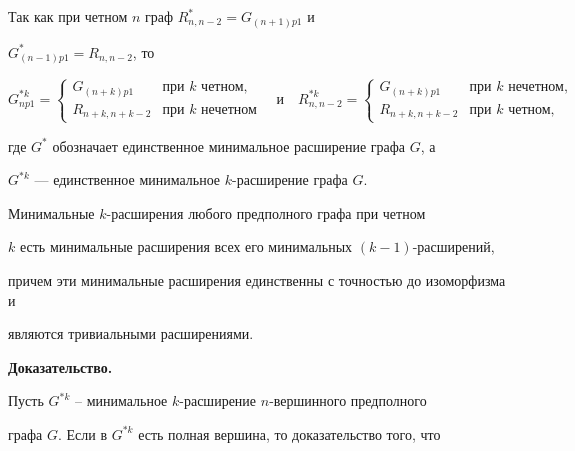 \begin{cornonum}


Так как при четном $n$ граф $R^*_{n,n-2} = G_{(n+1)p1}$ и


$G^{*}_{(n-1)p1} = R_{n,n-2}$, то


$$


G^{*k}_{np1} =


\begin{cases}


G_{(n+k)p1} & \text{при $k$ четном},\\


R_{n+k,n+k-2} & \text{при $k$ нечетном}


\end{cases}


\quad \text{и}\quad


R_{n,n-2}^{*k} =


\begin{cases}


G_{(n+k)p1} & \text{при $k$ нечетном}, \\


R_{n+k,n+k-2} & \text{при $k$ четном},


\end{cases}


$$


где $G^*$ обозначает единственное минимальное расширение графа $G$, а


$G^{*k}$ --- единственное минимальное $k$-расширение графа $G$.


\end{cornonum}





\begin{lem}


Минимальные $k$-расширения любого предполного графа при четном


$k$ есть минимальные расширения всех его минимальных $(k-1)$-расширений,


причем эти минимальные расширения единственны с точностью до изоморфизма и


являются тривиальными расширениями.


\end{lem}





{\bf Доказательство.}


Пусть $G^{*k}$ -- минимальное $k$-расширение $n$-вершинного предполного


графа $G$. Если в $G^{*k}$ есть полная вершина, то доказательство того, что


